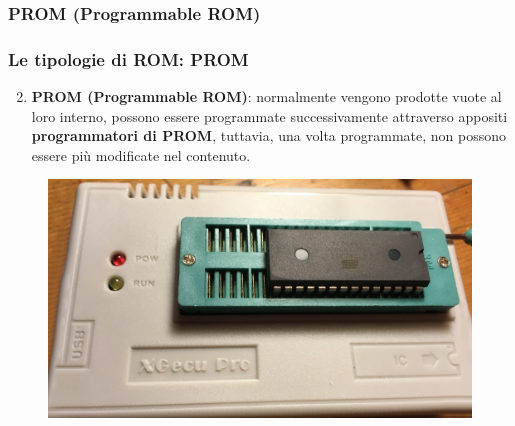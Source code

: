\subsubsection[PROM  (Programmable  ROM)]{PROM  (Programmable  ROM)}
\begin{frame}
	\frametitle{Le tipologie di ROM: PROM}
	  
	\begin{block}{}
		
		\begin{enumerate}
			\setcounter{enumi}{1}
			\item \textbf{PROM  (Programmable  ROM)}: normalmente vengono prodotte vuote al loro interno, possono essere programmate successivamente attraverso appositi \textbf{programmatori di PROM},  tuttavia, una volta programmate, non possono essere più modificate nel  contenuto.
		\end{enumerate}
	\end{block}
	
	\begin{figure}[!htbp] 
		\centering
		\includegraphics[width=0.7\linewidth]{images/5_memory/prom_programmer.png}
	\end{figure}
	
\end{frame}



